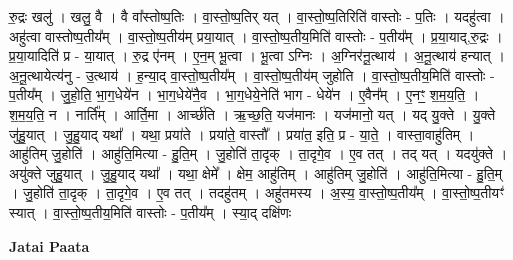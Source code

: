 \documentclass[17pt]{extarticle}
\begin{document}
रु॒द्रः खलु॑ । खलु॒ वै । वै वा᳚स्तोष्प॒तिः । वा॒स्तो॒ष्प॒तिर् यत् । वा॒स्तो॒ष्प॒तिरिति॑ वास्तोः - प॒तिः । यदहु॑त्वा । अहु॑त्वा वास्तोष्प॒तीय᳚म् । वा॒स्तो॒ष्प॒तीय॑म् प्रया॒यात् । वा॒स्तो॒ष्प॒तीय॒मिति॑ वास्तोः - प॒तीय᳚म् । प्र॒या॒याद्,रु॒द्रः । प्र॒या॒यादिति॑ प्र - या॒यात् । रु॒द्र ए॑नम् । ए॒न॒म् भू॒त्वा । भू॒त्वा ऽग्निः । अ॒ग्निर॑नू॒त्थाय॑ । अ॒नू॒त्थाय॑ हन्यात् । अ॒नू॒त्थायेत्य॑नु - उ॒त्थाय॑ । ह॒न्या॒द् वा॒स्तो॒ष्प॒तीय᳚म् । वा॒स्तो॒ष्प॒तीय॑म् जुहोति । वा॒स्तो॒ष्प॒तीय॒मिति॑ वास्तोः - प॒तीय᳚म् । जु॒हो॒ति॒ भा॒ग॒धेये॑न । भा॒ग॒धेये॑नै॒व । भा॒ग॒धेये॒नेति॑ भाग - धेये॑न । ए॒वैन᳚म् । ए॒नꣳ॒॒ श॒म॒य॒ति॒ । श॒म॒य॒ति॒ न । नार्ति᳚म् । आर्ति॒मा । आर्च्छ॑ति । ऋ॒च्छ॒ति॒ यज॑मानः । यज॑मानो॒ यत् । यद् यु॒क्ते । यु॒क्ते जु॑हु॒यात् । जु॒हु॒याद् यथा᳚ । यथा॒ प्रया॑ते । प्रया॑ते॒ वास्तौ᳚ । प्रया॑त॒ इति॒ प्र - या॒ते॒ । वास्ता॒वाहु॑तिम् । आहु॑तिम् जु॒होति॑ । आहु॑ति॒मित्या - हु॒ति॒म् । जु॒होति॑ ता॒दृक् । ता॒दृगे॒व । ए॒व तत् । तद् यत् । यदयु॑क्ते । अयु॑क्ते जुहु॒यात् । जु॒हु॒याद् यथा᳚ । यथा॒ क्षेमे᳚ । क्षेम॒ आहु॑तिम् । आहु॑तिम् जु॒होति॑ । आहु॑ति॒मित्या - हु॒ति॒म् । जु॒होति॑ ता॒दृक् । ता॒दृगे॒व । ए॒व तत् । तदहु॑तम् । अहु॑तमस्य । अ॒स्य॒ वा॒स्तो॒ष्प॒तीय᳚म् । वा॒स्तो॒ष्प॒तीयꣳ॑ स्यात् । वा॒स्तो॒ष्प॒तीय॒मिति॑ वास्तोः - प॒तीय᳚म् । स्या॒द् दक्षि॑णः \newline

\textbf{Jatai Paata} \newline
\end{document}
